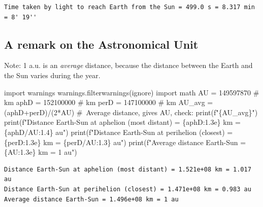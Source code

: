 \documentclass[
  letterpaper,
  DIV=11,
  numbers=noendperiod]{scrreprt}
\newenvironment{Shaded}{\begin{snugshade}}{\end{snugshade}}
\newcommand{\BuiltInTok}[1]{\textcolor[rgb]{0.00,0.23,0.31}{#1}}
\newcommand{\CommentTok}[1]{\textcolor[rgb]{0.37,0.37,0.37}{#1}}
\newcommand{\DecValTok}[1]{\textcolor[rgb]{0.68,0.00,0.00}{#1}}
\newcommand{\ImportTok}[1]{\textcolor[rgb]{0.00,0.46,0.62}{#1}}
\newcommand{\NormalTok}[1]{\textcolor[rgb]{0.00,0.23,0.31}{#1}}
\newcommand{\OperatorTok}[1]{\textcolor[rgb]{0.37,0.37,0.37}{#1}}
\newcommand{\SpecialCharTok}[1]{\textcolor[rgb]{0.37,0.37,0.37}{#1}}
\newcommand{\SpecialStringTok}[1]{\textcolor[rgb]{0.13,0.47,0.30}{#1}}
\newcommand{\StringTok}[1]{\textcolor[rgb]{0.13,0.47,0.30}{#1}}
\begin{document}
\begin{verbatim}
Time taken by light to reach Earth from the Sun = 499.0 s = 8.317 min = 8' 19'' 
\end{verbatim}

\hypertarget{a-remark-on-the-astronomical-unit}{%
\subsection{A remark on the Astronomical
Unit}\label{a-remark-on-the-astronomical-unit}}

Note: 1 a.u. is an \emph{average} distance, because the distance between
the Earth and the Sun varies during the year.

\begin{Shaded}
\begin{Highlighting}[]
\ImportTok{import}\NormalTok{ warnings}
\NormalTok{warnings.filterwarnings(}\StringTok{\textquotesingle{}ignore\textquotesingle{}}\NormalTok{)}
\ImportTok{import}\NormalTok{ math}
\NormalTok{AU }\OperatorTok{=} \DecValTok{149597870} \CommentTok{\# km}
\NormalTok{aphD }\OperatorTok{=} \DecValTok{152100000} \CommentTok{\# km}
\NormalTok{perD }\OperatorTok{=} \DecValTok{147100000} \CommentTok{\# km}
\NormalTok{AU\_avg }\OperatorTok{=}\NormalTok{ (aphD}\OperatorTok{+}\NormalTok{perD)}\OperatorTok{/}\NormalTok{(}\DecValTok{2}\OperatorTok{*}\NormalTok{AU) }\CommentTok{\# Average distance, gives AU, check: print(f"\{AU\_avg\}")}
\BuiltInTok{print}\NormalTok{(}\SpecialStringTok{f"Distance Earth{-}Sun at aphelion (most distant) = }\SpecialCharTok{\{}\NormalTok{aphD}\SpecialCharTok{:1.3e\}}\SpecialStringTok{ km = }\SpecialCharTok{\{}\NormalTok{aphD}\OperatorTok{/}\NormalTok{AU}\SpecialCharTok{:1.4\}}\SpecialStringTok{ au"}\NormalTok{)}
\BuiltInTok{print}\NormalTok{(}\SpecialStringTok{f"Distance Earth{-}Sun at perihelion (closest) = }\SpecialCharTok{\{}\NormalTok{perD}\SpecialCharTok{:1.3e\}}\SpecialStringTok{ km = }\SpecialCharTok{\{}\NormalTok{perD}\OperatorTok{/}\NormalTok{AU}\SpecialCharTok{:1.3\}}\SpecialStringTok{ au"}\NormalTok{)}
\BuiltInTok{print}\NormalTok{(}\SpecialStringTok{f"Average distance Earth{-}Sun = }\SpecialCharTok{\{}\NormalTok{AU}\SpecialCharTok{:1.3e\}}\SpecialStringTok{ km = 1 au"}\NormalTok{)}
\end{Highlighting}
\end{Shaded}

\begin{verbatim}
Distance Earth-Sun at aphelion (most distant) = 1.521e+08 km = 1.017 au
Distance Earth-Sun at perihelion (closest) = 1.471e+08 km = 0.983 au
Average distance Earth-Sun = 1.496e+08 km = 1 au
\end{verbatim}
\end{document}
